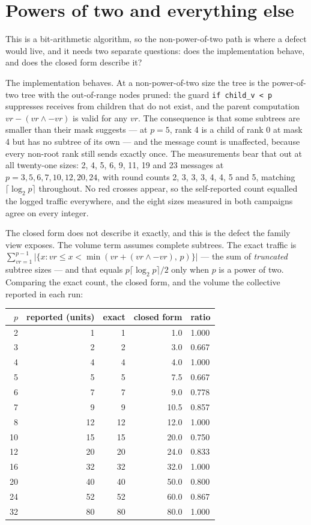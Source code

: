 \documentclass[11pt]{article}
\begin{document}
\section{Powers of two and everything else}

This is a bit-arithmetic algorithm, so the non-power-of-two path is where a defect would live,
and it needs two separate questions: does the implementation behave, and does the closed form
describe it?

The implementation behaves. At a non-power-of-two size the tree is the power-of-two tree with the
out-of-range nodes pruned: the guard \texttt{if child\_v < p} suppresses receives from children
that do not exist, and the parent computation $vr - (vr \wedge -vr)$ is valid for any $vr$. The
consequence is that some subtrees are smaller than their mask suggests --- at $p=5$, rank 4 is a
child of rank 0 at mask 4 but has no subtree of its own --- and the message count is unaffected,
because every non-root rank still sends exactly once. The measurements bear that out at all
twenty-one sizes: 2, 4, 5, 6, 9, 11, 19 and 23 messages at $p = 3, 5, 6, 7, 10, 12, 20, 24$, with
round counts 2, 3, 3, 3, 4, 4, 5 and 5, matching $\lceil\log_2 p\rceil$ throughout. No red
crosses appear, so the self-reported count equalled the logged traffic everywhere, and the eight
sizes measured in both campaigns agree on every integer.

The closed form does not describe it exactly, and this is the defect the family view exposes. The
volume term assumes complete subtrees. The exact traffic is
$\sum_{vr=1}^{p-1} |\{x : vr \leq x < \min(vr + (vr \wedge -vr),\, p)\}|$ --- the sum of
\emph{truncated} subtree sizes --- and that equals $p\lceil\log_2 p\rceil/2$ only when $p$ is a
power of two. Comparing the exact count, the closed form, and the volume the collective reported
in each run:

\begin{center}\footnotesize
\begin{tabular}{@{}rrrrl@{}}
\toprule
$p$ & reported (units) & exact & closed form & ratio \\
\midrule
 2 &  1 &  1 &  1.0 & 1.000 \\
 3 &  2 &  2 &  3.0 & 0.667 \\
 4 &  4 &  4 &  4.0 & 1.000 \\
 5 &  5 &  5 &  7.5 & 0.667 \\
 6 &  7 &  7 &  9.0 & 0.778 \\
 7 &  9 &  9 & 10.5 & 0.857 \\
 8 & 12 & 12 & 12.0 & 1.000 \\
10 & 15 & 15 & 20.0 & 0.750 \\
12 & 20 & 20 & 24.0 & 0.833 \\
16 & 32 & 32 & 32.0 & 1.000 \\
20 & 40 & 40 & 50.0 & 0.800 \\
24 & 52 & 52 & 60.0 & 0.867 \\
32 & 80 & 80 & 80.0 & 1.000 \\
\bottomrule
\end{tabular}\normalsize
\end{center}
\end{document}
